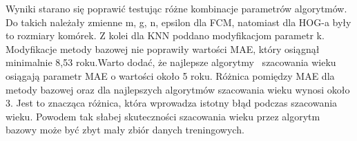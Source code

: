 \documentclass[a4paper,twoside,12pt]{book}
\newcounter{stronyPozaNumeracja}
\begin{document}
    Wyniki starano się poprawić testując różne kombinacje parametrów algorytmów.
    Do takich należały zmienne m, g, n, epsilon dla FCM, natomiast dla HOG-a były to rozmiary komórek.
    Z kolei dla KNN poddano modyfikacjom parametr k. Modyfikacje metody bazowej nie poprawiły wartości MAE,
    który osiągnął minimalnie 8,53 roku.Warto dodać, że najlepsze algorytmy~\cite{khryashchevGanin}
    szacowania wieku osiągają parametr MAE o wartości około 5 roku.
    Różnica pomiędzy MAE dla metody bazowej oraz dla
    najlepszych algorytmów szacowania wieku wynosi około 3. Jest to znacząca różnica, która wprowadza
    istotny błąd podczas szacowania wieku. Powodem tak słabej skuteczności szacowania wieku przez algorytm
    bazowy może być zbyt mały zbiór danych treningowych.


    \backmatter
    \setcounter{page}{\value{stronyPozaNumeracja}}

    \pagestyle{tylkoNumeryStron}

    
    

\end{document}
